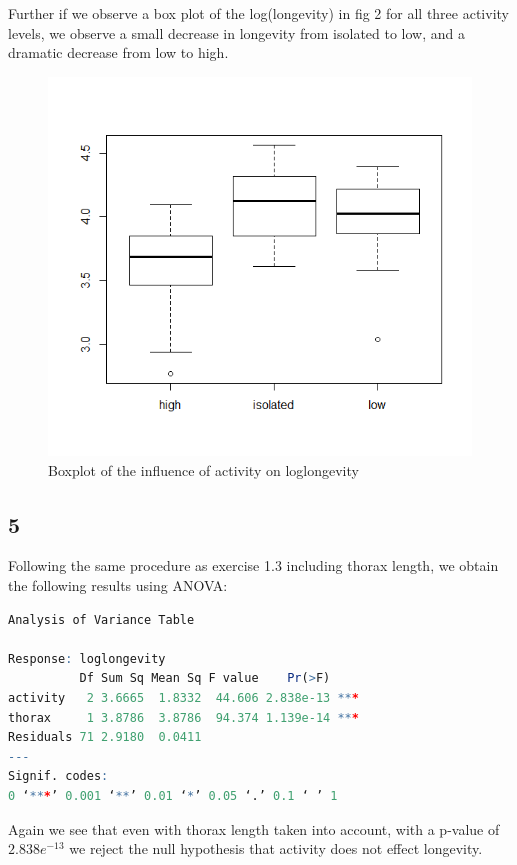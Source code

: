 \documentclass{article}
\begin{document}
      Further if we observe a box plot of the log(longevity) in fig 2 for all three activity levels, we observe a small decrease in longevity from isolated to low, and a dramatic decrease from low to high.
      \begin{figure}[H]
          \centering
          \includegraphics[scale=0.3]{../results/BoxActivity.png}
          \caption{Boxplot of the influence of activity on loglongevity}
          \label{fig:BoxActivity}
      \end{figure}

    \subsection*{5}
    Following the same procedure as exercise 1.3 including thorax length, we obtain the following results using ANOVA:
    \begin{lstlisting}[language=R]
Analysis of Variance Table

Response: loglongevity
          Df Sum Sq Mean Sq F value    Pr(>F)    
activity   2 3.6665  1.8332  44.606 2.838e-13 ***
thorax     1 3.8786  3.8786  94.374 1.139e-14 ***
Residuals 71 2.9180  0.0411                      
---
Signif. codes:  
0 ‘***’ 0.001 ‘**’ 0.01 ‘*’ 0.05 ‘.’ 0.1 ‘ ’ 1       
      \end{lstlisting}
      Again we see that even with thorax length taken into account, with a p-value of $2.838e^{-13}$ we reject the null hypothesis that activity does not effect longevity.
\end{document}
